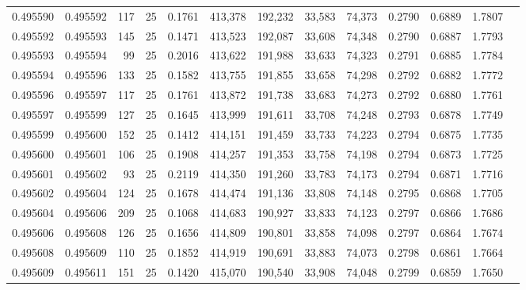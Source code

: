 \begin{tabular}{rrrrrrrrrrrrr}
0.495590 & 0.495592 &   117 &  25 &                                     0.1761 & 413,378 & 192,232 &  33,583 &  74,373 & 0.2790 & 0.6889 & 1.7807 \\
0.495592 & 0.495593 &   145 &  25 &                                     0.1471 & 413,523 & 192,087 &  33,608 &  74,348 & 0.2790 & 0.6887 & 1.7793 \\
0.495593 & 0.495594 &    99 &  25 &                                     0.2016 & 413,622 & 191,988 &  33,633 &  74,323 & 0.2791 & 0.6885 & 1.7784 \\
0.495594 & 0.495596 &   133 &  25 &                                     0.1582 & 413,755 & 191,855 &  33,658 &  74,298 & 0.2792 & 0.6882 & 1.7772 \\
0.495596 & 0.495597 &   117 &  25 &                                     0.1761 & 413,872 & 191,738 &  33,683 &  74,273 & 0.2792 & 0.6880 & 1.7761 \\
0.495597 & 0.495599 &   127 &  25 &                                     0.1645 & 413,999 & 191,611 &  33,708 &  74,248 & 0.2793 & 0.6878 & 1.7749 \\
0.495599 & 0.495600 &   152 &  25 &                                     0.1412 & 414,151 & 191,459 &  33,733 &  74,223 & 0.2794 & 0.6875 & 1.7735 \\
0.495600 & 0.495601 &   106 &  25 &                                     0.1908 & 414,257 & 191,353 &  33,758 &  74,198 & 0.2794 & 0.6873 & 1.7725 \\
0.495601 & 0.495602 &    93 &  25 &                                     0.2119 & 414,350 & 191,260 &  33,783 &  74,173 & 0.2794 & 0.6871 & 1.7716 \\
0.495602 & 0.495604 &   124 &  25 &                                     0.1678 & 414,474 & 191,136 &  33,808 &  74,148 & 0.2795 & 0.6868 & 1.7705 \\
0.495604 & 0.495606 &   209 &  25 &                                     0.1068 & 414,683 & 190,927 &  33,833 &  74,123 & 0.2797 & 0.6866 & 1.7686 \\
0.495606 & 0.495608 &   126 &  25 &                                     0.1656 & 414,809 & 190,801 &  33,858 &  74,098 & 0.2797 & 0.6864 & 1.7674 \\
0.495608 & 0.495609 &   110 &  25 &                                     0.1852 & 414,919 & 190,691 &  33,883 &  74,073 & 0.2798 & 0.6861 & 1.7664 \\
0.495609 & 0.495611 &   151 &  25 &                                     0.1420 & 415,070 & 190,540 &  33,908 &  74,048 & 0.2799 & 0.6859 & 1.7650 \\

\end{tabular}
